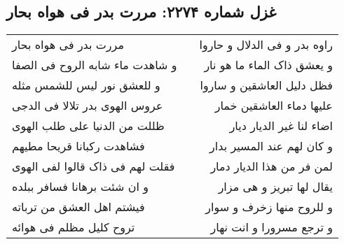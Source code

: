 \begin{center}
\section*{غزل شماره ۲۲۷۴: مررت بدر فی هواه بحار}
\label{sec:2274}
\begin{longtable}{l p{0.5cm} r}
مررت بدر فی هواه بحار
&&
راوه بدر و فی الدلال و حاروا
\\
و شاهدت ماء شابه الروح فی الصفا
&&
و یعشق ذاک الماء ما هو نار
\\
و للعشق نور لیس للشمس مثله
&&
فظل دلیل العاشقین و ساروا
\\
عروس الهوی بدر تلالا فی الدجی
&&
علیها دماء العاشقین خمار
\\
ظللت من الدنیا علی طلب الهوی
&&
اضاء لنا غیر الدیار دیار
\\
فشاهدت رکبانا قریحا مطیهم
&&
و کان لهم عند المسیر بدار
\\
فقلت لهم فی ذاک قالوا لفی الهوی
&&
لمن فر من هذا الدیار دمار
\\
و ان شئت برهانا فسافر ببلده
&&
یقال لها تبریز و هی مزار
\\
فیشتم اهل العشق من ترباته
&&
و للروح منها زخرف و سوار
\\
تروح کلیل مظلم فی هوائه
&&
و ترجع مسرورا و انت نهار
\\
\end{longtable}
\end{center}
